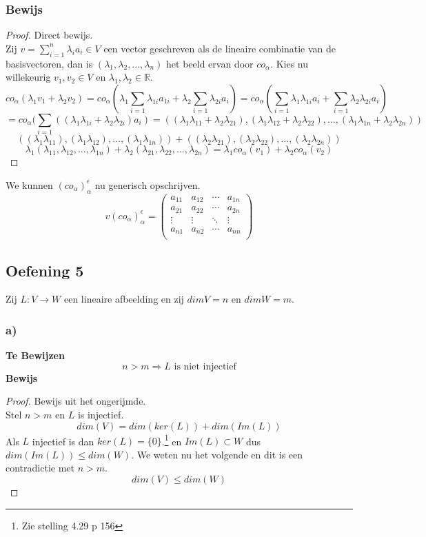 \documentclass[lineaire_algebra_oplossingen.tex]{subfiles}
\begin{document}
\subsubsection*{Bewijs}
\begin{proof}
Direct bewijs.\\
Zij $v = \sum_{i=1}^n\lambda_ia_i \in V$ een vector geschreven als de lineaire combinatie van de basisvectoren, dan is $(\lambda_1,\lambda_2,...,\lambda_n)$ het beeld ervan door $co_\alpha$.
Kies nu willekeurig $v_1,v_2 \in V$ en $\lambda_1,\lambda_2\in \mathbb{R}$.
\[
co_\alpha(\lambda_1v_1+\lambda_2v_2)= co_\alpha(\lambda_1\sum_{i=1}\lambda_{1i}a_{1i} + \lambda_2\sum_{i=1}\lambda_{2i}a_{i}) = co_\alpha(\sum_{i=1}\lambda_1\lambda_{1i}a_{i} + \sum_{i=1}\lambda_2\lambda_{2i}a_{i})
\]
\[
= co_\alpha(\sum_{i=1}((\lambda_1\lambda_{1i}+\lambda_2\lambda_{2i})a_{i}) = ((\lambda_1\lambda_{11}+\lambda_2\lambda_{21}),(\lambda_1\lambda_{12}+\lambda_2\lambda_{22}),...,(\lambda_1\lambda_{1n}+\lambda_2\lambda_{2n}))
\]
\[
((\lambda_1\lambda_{11}),(\lambda_1\lambda_{12}),...,(\lambda_1\lambda_{1n}))+((\lambda_2\lambda_{21}),(\lambda_2\lambda_{22}),...,(\lambda_2\lambda_{2n}))
\]
\[
\lambda_1(\lambda_{11},\lambda_{12},...,\lambda_{1n})+ \lambda_2(\lambda_{21},\lambda_{22},...,\lambda_{2n}) = \lambda_1co_\alpha(v_1)+\lambda_2co_\alpha(v_2)
\]
\end{proof}
We kunnen $(co_\alpha)_\alpha^\epsilon$ nu generisch opschrijven.
\[
v(co_\alpha)_\alpha^\epsilon = 
\begin{pmatrix}
a_{11} & a_{12} & \cdots & a_{1n}\\
a_{21} & a_{22} & \cdots & a_{2n}\\
\vdots & \vdots & \ddots & \vdots\\
a_{n1} & a_{n2} & \cdots & a_{nn}\\
\end{pmatrix}
\]

\subsection{Oefening 5}
Zij $L:V \rightarrow W$ een lineaire afbeelding en zij $dim V = n$ en $dim W = m$.\\
\subsubsection*{a)}
\textbf{Te Bewijzen}
\[
n > m \Rightarrow L \text{ is niet injectief}
\]
\textbf{Bewijs}
\begin{proof}
Bewijs uit het ongerijmde.\\
Stel $n>m$ en $L$ is injectief.
\[
dim(V) = dim(ker(L)) + dim(Im(L))
\]
Als $L$ injectief is dan $ker(L)=\{0\}$.\footnote{Zie stelling 4.29 p 156} en $Im(L) \subset W$ dus $dim(Im(L))\le dim(W)$. We weten nu het volgende en dit is een contradictie met $n>m$.
\[
dim(V) \le dim(W)
\]
\end{proof}
\end{document}
